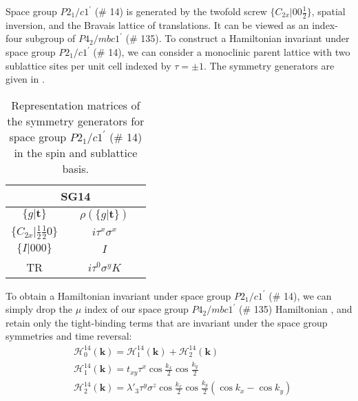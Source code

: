 \documentclass[prb,aps,amssymb,twocolumn,notitlepage]{revtex4-2}
\begin{document}
Space group $P2_1/c1^\prime$ (\# 14) is generated by the twofold screw $\{C_{2x}|00\tfrac{1}{2}\}$, spatial inversion, and the Bravais lattice of translations. 
It can be viewed as an index-four subgroup of $P4_2/mbc1^\prime$ (\# 135). 
To construct a Hamiltonian invariant under space group $P2_1/c1^\prime$ (\# 14), we can consider a monoclinic parent lattice with two sublattice sites per unit cell indexed by $\tau=\pm 1$. 
The symmetry generators are given in .
\begin{table}[ht]
\caption{Representation matrices of the symmetry generators for space group $P2_1/c1^\prime$ (\# 14) in the spin and sublattice basis.} %
\centering %
\renewcommand*{\arraystretch}{1.4}
\begin{tabular}{c c c c} %
\hline\hline %
\multicolumn{4}{c}{SG14}\\[0.5ex]
\hline %
$\{g|\mathbf{t}\}$ & & $\rho\left(\{g|\mathbf{t}\}\right)$ & \\ %
$\{C_{2x}|\tfrac{1}{2}\tfrac{1}{2}0\}$ & &  $i\tau^x\sigma^x$ & \\
$\{I|000\}$ & & $I$ & \\
TR & & $i\tau^0\sigma^y K$ &\\ [1ex] %
\hline %
\end{tabular}
\label{table:generatorsGammaSG14} %
\end{table}

To obtain a Hamiltonian invariant under space group $P2_1/c1^\prime$ (\# 14), we can simply drop the $\mu$ index of our space group $P4_2/mbc1^\prime$ (\# 135) Hamiltonian , and retain only the tight-binding terms that are invariant under the space group symmetries and time reversal:
\begin{align}
    &\mathcal{H}^{14}_{0}(\mathbf{k})=\mathcal{H}^{14}_{1}(\mathbf{k})+\mathcal{H}^{14}_{2}(\mathbf{k})\nonumber \\
    &\mathcal{H}^{14}_1(\mathbf{k})=t_{xy}\tau^x\cos\tfrac{k_x}{2}\cos\tfrac{k_y}{2}\\
    &\mathcal{H}^{14}_{2}(\mathbf{k})=\lambda'_3\tau^y\sigma^z\cos\tfrac{k_x}{2}\cos\tfrac{k_y}{2}(\cos k_x-\cos k_y) \nonumber
    \label{eq:sg14ham}
\end{align}
\end{document}
